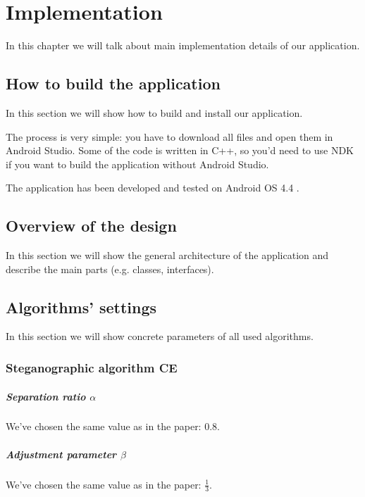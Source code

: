 \chapter{Implementation}

In this chapter we will talk about main implementation details of
our application.

\section{How to build the application}
In this section we will show how to build and install our application.

The process is very simple: you have to download all files and open them
in Android Studio. Some of the code is written in C++, so you'd need to 
use NDK if you want to build the application without Android Studio.

The application has been developed and tested on Android OS 4.4 .

\section{Overview of the design}
In this section we will show the general architecture of the application
and describe the main parts (e.g. classes, interfaces).





\section{Algorithms' settings}
In this section we will show concrete parameters of all used algorithms.

\subsection{Steganographic algorithm CE}

\paragraph{Separation ratio $\alpha$} We've chosen the same value as in the 
paper: $0.8$.

\paragraph{Adjustment parameter $\beta$} We've chosen the same value as in the paper: $\frac{1}{3}$.

